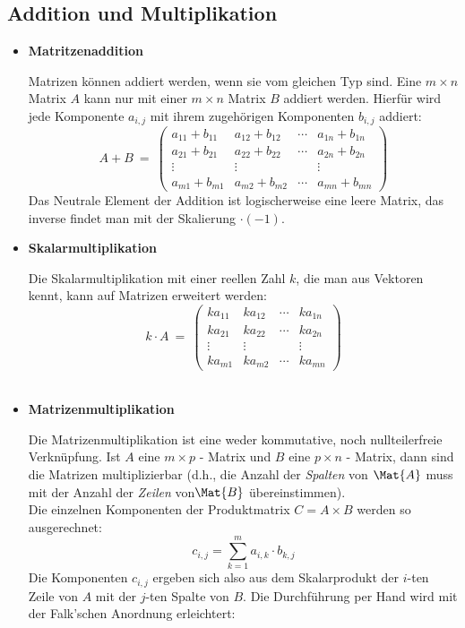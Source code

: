 \documentclass[../MAIN/main.tex]{subfiles}
\begin{document}
\subsection{Addition und Multiplikation}

\begin{itemize}

\item{\textbf{Matritzenaddition}}

Matrizen können addiert werden, wenn sie vom gleichen Typ sind. Eine $m\times n$ Matrix $A$ kann nur mit einer $m\times n$ Matrix $B$ addiert werden. Hierfür wird jede Komponente $a_{i,j}$ mit ihrem zugehörigen Komponenten $b_{i,j}$ addiert:
$$A + B \ = \  \left(
    \begin{array}{cccc}
        a_{11}+ b_{11} & a_{12}+ b_{12} &
            \cdots & a_{1n}+ b_{1n} \\
        a_{21}+ b_{21} & a_{22}+ b_{22} &
            \cdots & a_{2n}+ b_{2n} \\
        \vdots & \vdots &  & \vdots \\
        a_{m1}+ b_{m1} & a_{m2}+ b_{m2} &
            \cdots & a_{mn}+ b_{mn}
    \end{array}
    \right)$$
Das Neutrale Element der Addition ist logischerweise eine leere Matrix, das inverse findet man mit der Skalierung $\cdot (-1)$.\\

\item{\textbf{Skalarmultiplikation}}

Die Skalarmultiplikation mit einer reellen Zahl $k$, die man aus Vektoren kennt, kann auf Matrizen erweitert werden:
$$k\cdot A \ = \ \left(
    \begin{array}{cccc}
        k a_{11} & k a_{12} & \cdots & k a_{1n} \\
        k a_{21} & k a_{22} & \cdots & k a_{2n} \\
        \vdots & \vdots &  & \vdots \\
        k a_{m1} & k a_{m2} & \cdots & k a_{mn}
    \end{array}
    \right) $$\\

\item{\textbf{Matrizenmultiplikation}}

Die Matrizenmultiplikation ist eine weder kommutative, noch nullteilerfreie Verknüpfung. Ist $A$ eine $m\times p$ - Matrix und $B$ eine $p\times n$ - Matrix, dann sind die Matrizen multiplizierbar (d.h., die Anzahl der \textit{Spalten}
von $\Mat{A}$ muss mit der Anzahl der \textit{Zeilen} von$\Mat{B}$ übereinstimmen).\\
Die einzelnen Komponenten der Produktmatrix $C = A \times B$ werden so ausgerechnet:
  $$c_{i,j} = \sum_{k=1}^{m} a_{i,k} \cdot b_{k,j}$$
Die Komponenten $c_{i,j}$ ergeben sich also aus dem Skalarprodukt der $i$-ten Zeile von $A$ mit der $j$-ten Spalte von $B$. Die Durchführung per Hand wird mit der Falk'schen Anordnung erleichtert:


\end{itemize}
\end{document}
